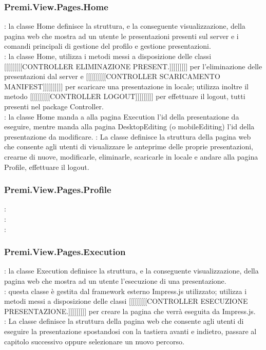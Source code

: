 {		\subsubsection{Premi.View.Pages.Home}{
			\textbf{\tipo}: la classe Home definisce la struttura, e la conseguente visualizzazione, della pagina web che mostra ad un utente le presentazioni presenti sul server e i comandi principali di gestione del profilo e gestione presentazioni.\\	
			\textbf{\relaz}: la classe Home, utilizza i metodi messi a disposizione delle classi [[[[[[[[[CONTROLLER ELIMINAZIONE PRESENT.]]]]]]]]] per l'eliminazione delle presentazioni dal server e [[[[[[[[[[CONTROLLER SCARICAMENTO MANIFEST]]]]]]]]]] per scaricare una presentazione in locale; utilizza inoltre il metodo [[[[[[[[[[CONTROLLER LOGOUT]]]]]]]]] per effettuare il logout, tutti presenti nel package Controller.\\
			\textbf{\interfacce}: la classe Home manda a alla pagina Execution l'id della presentazione da eseguire, mentre manda alla pagina DesktopEditing (o mobileEditing) l'id della presentazione da modificare.
			\textbf{\attivita}: La classe definisce la struttura della pagina web che consente agli utenti di visualizzare le anteprime delle proprie presentazioni, crearne di nuove, modificarle, eliminarle, scaricarle in locale e andare alla pagina Profile, effettuare il logout.\\
		}
		\subsubsection{Premi.View.Pages.Profile}{
			\textbf{\tipo}: \\
			\textbf{\relaz}: \\
			\textbf{\attivita}: \\
		}
		\subsubsection{Premi.View.Pages.Execution}{
			\textbf{\tipo}: la classe Execution definisce la struttura, e la conseguente visualizzazione, della pagina web che mostra ad un utente l'esecuzione di una presentazione.\\
			\textbf{\relaz}: questa classe è gestita dal framework esterno Impress.js utilizzato; utilizza i metodi messi a disposizione delle classi [[[[[[[[[CONTROLLER ESECUZIONE PRESENTAZIONE.]]]]]]]]] per creare la pagina che verrà eseguita da Impress.js.\\
			\textbf{\attivita}: La classe definisce la struttura della pagina web che consente agli utenti di eseguire la presentazione spostandosi con la tastiera avanti e indietro, passare al capitolo successivo oppure selezionare un nuovo percorso.\\
		}
}
